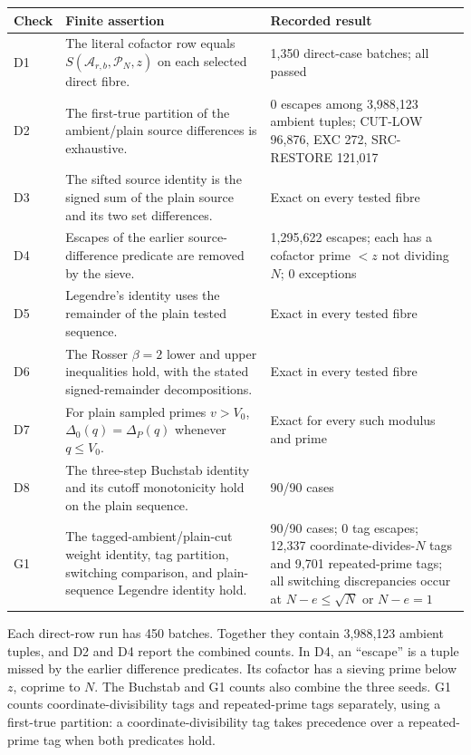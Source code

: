 \begingroup
\small
\setlength{\tabcolsep}{3pt}
\renewcommand{\arraystretch}{1.16}
\begin{longtable}{@{}p{} p{} p{}@{}}
\hline
\textbf{Check} & \textbf{Finite assertion} & \textbf{Recorded result} \\
\hline\endhead
D1 & The literal cofactor row equals $S(\mathcal A_{r,b},\mathcal P_N,z)$ on each selected direct fibre. & 1,350 direct-case batches; all passed \\
D2 & The first-true partition of the ambient/plain source differences is exhaustive. & 0 escapes among 3,988,123 ambient tuples; CUT-LOW 96,876, EXC 272, SRC-RESTORE 121,017 \\
D3 & The sifted source identity is the signed sum of the plain source and its two set differences. & Exact on every tested fibre \\
D4 & Escapes of the earlier source-difference predicate are removed by the sieve. & 1,295,622 escapes; each has a cofactor prime $<z$ not dividing $N$; 0 exceptions \\
D5 & Legendre's identity uses the remainder of the plain tested sequence. & Exact in every tested fibre \\
D6 & The Rosser $\beta=2$ lower and upper inequalities \cite{ref4} hold, with the stated signed-remainder decompositions. & Exact in every tested fibre \\
D7 & For plain sampled primes $v>V_0$, $\Delta_0(q)=\Delta_P(q)$ whenever $q\le V_0$. & Exact for every such modulus and prime \\
D8 & The three-step Buchstab identity and its cutoff monotonicity hold on the plain sequence. & 90/90 cases \\
G1 & The tagged-ambient/plain-cut weight identity, tag partition, switching comparison, and plain-sequence Legendre identity hold. & 90/90 cases; 0 tag escapes; 12,337 coordinate-divides-$N$ tags and 9,701 repeated-prime tags; all switching discrepancies occur at $N-e\le\sqrt N$ or $N-e=1$ \\
\hline
\end{longtable}
\endgroup

Each direct-row run has 450 batches.
Together they contain 3,988,123 ambient tuples,
and D2 and D4 report the combined counts.
In D4, an ``escape'' is a tuple missed by the earlier difference predicates.
Its cofactor has a sieving prime below $z$, coprime to $N$.
The Buchstab and G1 counts also combine the three seeds.
G1 counts coordinate-divisibility tags and repeated-prime tags separately,
using a first-true partition: a coordinate-divisibility tag takes precedence
over a repeated-prime tag when both predicates hold.

